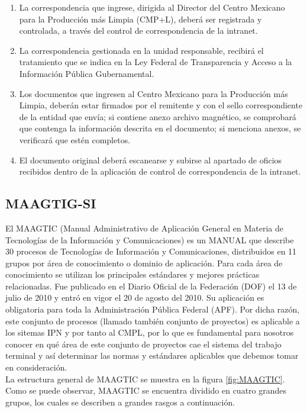 		\begin{enumerate}
			\item La correspondencia que ingrese, dirigida al Director del Centro Mexicano para la Producción más Limpia (CMP+L), deberá ser registrada y controlada, a través del control de correspondencia de la intranet.
			\item La correspondencia gestionada en la unidad responsable, recibirá el tratamiento que se indica en la Ley Federal de Transparencia y Acceso a la Información Pública Gubernamental.
			\item Los documentos que ingresen al Centro Mexicano para la Producción más Limpia, deberán estar firmados por el remitente y con el sello correspondiente de la entidad que envía; si contiene anexo archivo magnético, se comprobará que contenga la información descrita en el documento; si menciona anexos, se verificará que estén completos.
			\item El documento original deberá escanearse y subirse al apartado de oficios recibidos dentro de la aplicación de control de correspondencia de la intranet.
		\end{enumerate}
	
	\subsection{MAAGTIG-SI}%
	El MAAGTIC (Manual Administrativo de Aplicación General en Materia de Tecnologías de la Información y Comunicaciones) es un MANUAL que describe 30 procesos de Tecnologías de Información y Comunicaciones, distribuidos en 11 grupos por área de conocimiento o dominio de aplicación. Para cada área de conocimiento se utilizan los principales estándares y mejores prácticas relacionadas\cite{MAAGTICSI}. Fue publicado en el Diario Oficial de la Federación (DOF) el 13 de julio de 2010 y entró en vigor el 20 de agosto del 2010. Su aplicación es obligatoria para toda la Administración Pública Federal (APF). Por dicha razón, este conjunto de procesos (llamado también conjunto de proyectos) es aplicable a los sitemas IPN y por tanto al CMPL, por lo que es fundamental para nosotros conocer en qué área de este conjunto de proyectos cae el sistema del trabajo terminal y así determinar las normas y estándares aplicables que debemos tomar en consideración.\\
	
	La estructura general de MAAGTIC se muestra en la figura \ref{fig:MAAGTIC}. Como se puede observar, MAAGTIC se encuentra dividido en cuatro grandes grupos, los cuales se describen a grandes rasgos a continuación.\\
	
